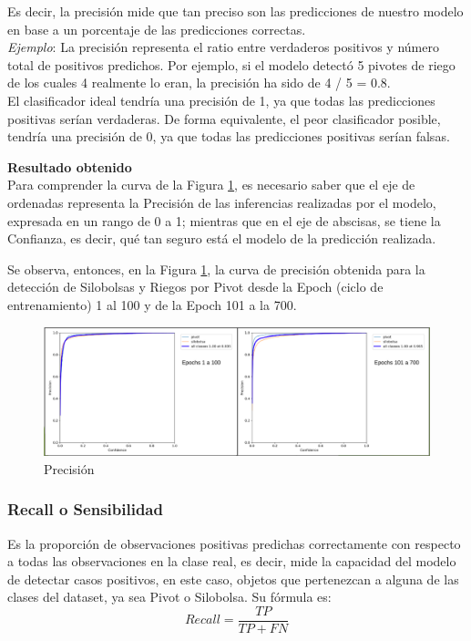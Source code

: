 Es decir, la precisión mide que tan preciso son las predicciones de nuestro modelo en base a un porcentaje de las predicciones correctas.\\

\textit{Ejemplo}:
La precisión representa el ratio entre verdaderos positivos y número total de positivos predichos. Por ejemplo, si el modelo detectó 5 pivotes de riego de los cuales 4 realmente lo eran, la precisión ha sido de 4 / 5 = 0.8.\\
El clasificador ideal tendría una precisión de 1, ya que todas las predicciones positivas serían verdaderas.
De forma equivalente, el peor clasificador posible, tendría una precisión de 0, ya que todas las predicciones positivas serían falsas.

\newpage
\textbf{Resultado obtenido}\\

Para comprender la curva de la Figura \ref{fig:precision}, es necesario saber que el eje de ordenadas representa la Precisión de las inferencias realizadas por el modelo, expresada en un rango de 0 a 1; mientras que en el eje de abscisas, se tiene la Confianza, es decir, qué tan seguro está el modelo de la predicción realizada.

Se observa, entonces, en la Figura \ref{fig:precision}, la curva de precisión obtenida para la detección de Silobolsas y Riegos por Pivot desde la Epoch (ciclo de entrenamiento) 1 al 100 y de la Epoch 101 a la 700. 
\begin{figure}[h!]
    \centering
    \includegraphics[width=1\textwidth]{img/Precision.png}
    \caption{Precisión}
    \label{fig:precision}
\end{figure}

\subsubsection{Recall o Sensibilidad} 
Es la proporción de observaciones positivas predichas correctamente con respecto a todas las observaciones en la clase real, es decir, mide la capacidad del modelo de detectar casos positivos, en este caso,
objetos que pertenezcan a alguna de las clases del dataset, ya sea Pivot o Silobolsa. Su fórmula es:  \[Recall=\frac{TP}{TP + FN}\]  

